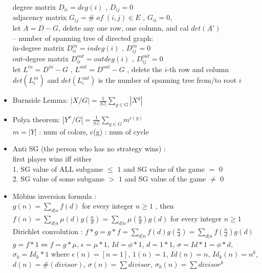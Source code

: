 \begin{itemize}[leftmargin=*]
  degree matrix $D_{ii} = deg(i)$ , $D_{ij} = 0$\\
  adjacency matrix $G_{ij} = \#\;of\;(i,j) \in E$ , $G_{ii} = 0$,\\
  let $A = D - G$, delete any one row, one column, and cal $det(A')$\\
  -- number of spanning tree of directed graph:\\
  in-degree matrix $D_{ii}^{in} = indeg(i)$ , $D_{ij}^{in} = 0$\\
  out-degree matrix $D_{ii}^{out} = outdeg(i)$ , $D_{ij}^{out} = 0$\\
  let $L^{in} = D^{in} - G$ , $L^{out} = D^{out} - G$ , delete the $i$-th row and column\\
  $det(L_i^{in})$ and $det(L_i^{out})$ is the number of spanning tree from/to root $i$\\
\item Burnside Lemma:
  $|X/G|=\frac{1}{|G|}\sum\limits_{g \in G} {|X^g|}$
\item Polya theorem:
  $|Y^x/G|=\frac{1}{|G|}\sum\limits_{g \in G} {m^{c(g)}}$\\
  $m = |Y|$ : num of colors, c(g) : num of cycle
\item Anti SG (the person who has no strategy wins) :\\
  first player wins iff either\\
  1. SG value of ALL subgame $\le$ $1$ and SG value of the game $=$ $0$\\
  2. SG value of some subgame $>$ $1$ and SG value of the game $\neq$ $0$
\item Möbius inversion formula :\\
  $g(n) = \sum\limits_{d|n}f(d)$ for every integer $n\ge 1$ , then\\
  $f(n) = \sum\limits_{d|n}\mu(d)g(\frac{n}{d}) = \sum\limits_{d|n}\mu(\frac{n}{d})g(d)$ for every integer $n\ge 1$\\
  Dirichlet convolution : $f*g=g*f=\sum\limits_{d|n}f(d)g(\frac{n}{d})=\sum\limits_{d|n}f(\frac{n}{d})g(d)$\\
  $g=f*1\Leftrightarrow f=g*\mu$, $\epsilon=\mu*1$, $Id=\phi*1$, $d=1*1$, $\sigma=Id*1=\phi*d$,\\
  $\sigma_k=Id_k*1$ where $\epsilon(n)=[n=1]$, $1(n)=1$, $Id(n)=n$, $Id_k(n)=n^k$,\\
  $d(n)=\#(divisor)$, $\sigma(n)=\sum divisor$, $\sigma_k(n)=\sum divisor^k$

\end{itemize}
